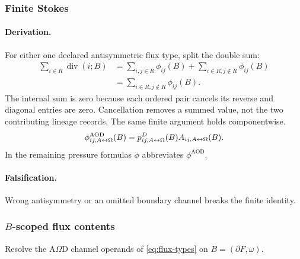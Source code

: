 \subsubsection{Finite Stokes}
\paragraph{Derivation.}
For either one declared antisymmetric flux type, split the double sum:
\begin{equation}
\begin{split}
\sum_{i\in R}\operatorname{div}(i;B)
&=\sum_{i,j\in R}\phi_{ij}(B)+\sum_{i\in R,j\notin R}\phi_{ij}(B)\\
&=\sum_{i\in R,j\notin R}\phi_{ij}(B).
\end{split}
\label{eq:afc-stokes-used}
\end{equation}
The internal sum is zero because each ordered pair cancels its reverse and
diagonal entries are zero. Cancellation removes a summed value, not the
two contributing lineage records. The same finite argument holds componentwise.
\begin{equation}
\phi^{\mathrm{AOD}}_{ij,A{\leftrightarrow}\Omega}(B)=p^D_{ij,A{\leftrightarrow}\Omega}(B)A_{ij,A{\leftrightarrow}\Omega}(B).
\label{eq:afc-flux-ao-resolution}
\end{equation}
In the remaining pressure formulas \(\phi\) abbreviates \(\phi^{\mathrm{AOD}}\).
\paragraph{Falsification.} Wrong antisymmetry or an omitted boundary channel
breaks the finite identity.

\subsubsection{\texorpdfstring{\(B\)-scoped flux contents}{B-scoped flux contents}}\label{subsec:b-scoped-flux-contents}
Resolve the A\(\Omega\)D channel operands of \eqref{eq:flux-types} on
\(B=(\partial F,\omega)\).

